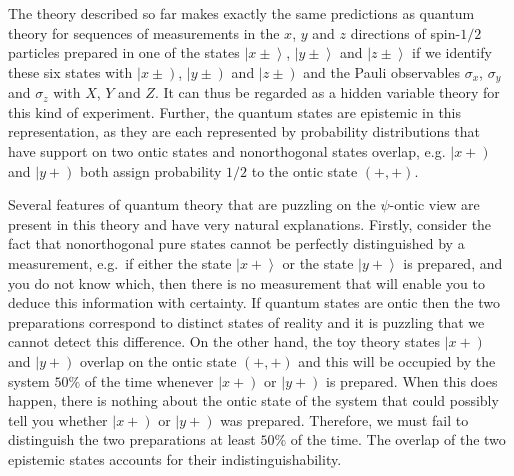 \documentclass[DIV=calc,paper=a4,fontsize=11pt,twocolumn]{scrartcl} %
\theoremstyle{definition}
\theoremstyle{plain}
\newcommand{\RKet}[1]{\ensuremath{\left \vert #1 \right )}}
\newcommand{\Ket}[1]{\ensuremath{\left \vert #1 \right \rangle}}
\begin{document}
The theory described so far makes exactly the same predictions as
quantum theory for sequences of measurements in the $x$, $y$ and $z$
directions of spin-$1/2$ particles prepared in one of the states
$\Ket{x \pm}$, $\Ket{y \pm}$ and $\Ket{z \pm}$ if we identify these
six states with $\RKet{x \pm}$, $\RKet{y \pm}$ and $\RKet{z \pm}$ and
the Pauli observables $\sigma_x$, $\sigma_y$ and $\sigma_z$ with $X$,
$Y$ and $Z$.  It can thus be regarded as a hidden variable theory for
this kind of experiment.  Further, the quantum states are epistemic in
this representation, as they are each represented by probability
distributions that have support on two ontic states and nonorthogonal
states overlap, e.g. $\RKet{x+}$ and $\RKet{y+}$ both assign
probability $1/2$ to the ontic state $(+,+)$.

Several features of quantum theory that are puzzling on the
$\psi$-ontic view are present in this theory and have very natural
explanations.  Firstly, consider the fact that nonorthogonal pure
states cannot be perfectly distinguished by a measurement, e.g.\ if
either the state $\Ket{x+}$ or the state $\Ket{y+}$ is prepared, and
you do not know which, then there is no measurement that will enable
you to deduce this information with certainty.  If quantum states are
ontic then the two preparations correspond to distinct states of
reality and it is puzzling that we cannot detect this difference.  On
the other hand, the toy theory states $\RKet{x+}$ and $\RKet{y+}$
overlap on the ontic state $(+,+)$ and this will be occupied by the
system $50\%$ of the time whenever $\RKet{x+}$ or $\RKet{y+}$ is
prepared.  When this does happen, there is nothing about the ontic
state of the system that could possibly tell you whether $\RKet{x+}$
or $\RKet{y+}$ was prepared.  Therefore, we must fail to distinguish
the two preparations at least $50\%$ of the time.  The overlap of the
two epistemic states accounts for their indistinguishability.
\end{document}
